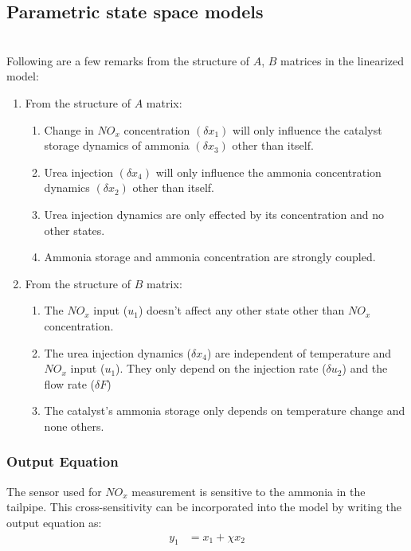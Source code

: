 \subsection{Parametric state space models}



\bigskip

\noindent{}\\

Following are a few remarks from the structure of $A$, $B$ matrices in the
linearized model:

\begin{enumerate}
    \item From the structure of $A$ matrix:
    \begin{enumerate}
\item Change in $NO_x$ concentration $(\delta x_1)$ will only influence the
catalyst storage dynamics of ammonia $(\delta x_3)$ other than itself.

\item Urea injection $(\delta x_4)$ will only influence the ammonia
concentration dynamics $(\delta x_2)$ other than itself.

\item Urea injection dynamics are only effected by its concentration and
no other states.

\item Ammonia storage and ammonia concentration are strongly coupled.
    \end{enumerate}
    \item From the structure of $B$ matrix:
    \begin{enumerate}
        \item The $NO_x$ input ($u_1$) doesn't affect any other state other than $NO_x$ concentration.

\item The urea injection dynamics ($\delta x_4$) are independent of temperature
and $NO_x$ input ($u_1$). They only depend on the injection rate ($\delta u_2$)
and the flow rate ($\delta F$)

\item The catalyst's ammonia storage only depends on temperature change and none others.
    \end{enumerate}
\end{enumerate}



\subsubsection{Output Equation}
The sensor used for $NO_x$ measurement is sensitive to the ammonia in the
tailpipe. This cross-sensitivity can be incorporated into the model by writing
the output equation as:
\begin{align*}
    y_1 &= x_1 + \chi x_2\\
\end{align*}

